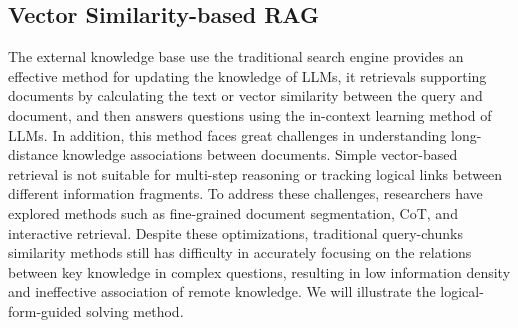 \documentclass{article}
\begin{document}
\subsection{Vector Similarity-based RAG}
The external knowledge base use the traditional search engine provides an effective method for updating the knowledge of LLMs, it retrievals supporting documents by calculating the text or vector similarity\cite{gao2023retrieval, fan2024survey} between the query and document, and then answers questions using the in-context learning method of LLMs. In addition, this method faces great challenges in understanding long-distance knowledge associations between documents. Simple vector-based retrieval is not suitable for multi-step reasoning or tracking logical links between different information fragments. To address these challenges, researchers have explored methods such as fine-grained document segmentation, CoT\cite{trivedi2022interleaving}, and interactive retrieval\cite{jiang2024retrieve,shao2023enhancing}. Despite these optimizations, traditional query-chunks similarity methods still has difficulty in accurately focusing on the relations between key knowledge in complex questions, resulting in low information density and ineffective association of remote knowledge. We will illustrate the logical-form-guided solving method.
\end{document}

